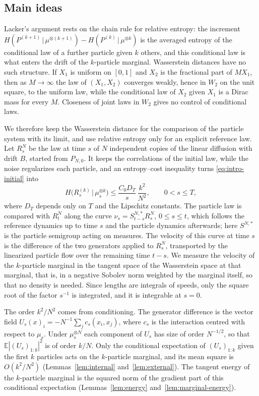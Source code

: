 \documentclass[11pt]{amsart}
\numberwithin{equation}{section}
\theoremstyle{plain}
\theoremstyle{remark}
\newcommand{\E}{\mathbb{E}}
\newcommand{\W}{W_2}
\begin{document}
\subsection{Main ideas}
Lacker's argument rests on the chain rule for relative entropy: the increment $H(P^{(k+1)}\,|\,\mu^{\otimes(k+1)})-H(P^{(k)}\,|\,\mu^{\otimes k})$ is the averaged entropy of the conditional law of a further particle given $k$ others, and this conditional law is what enters the drift of the $k$-particle marginal. Wasserstein distances have no such structure. If $X_1$ is uniform on $[0,1]$ and $X_2$ is the fractional part of $MX_1$, then as $M\to\infty$ the law of $(X_1,X_2)$ converges weakly, hence in $\W$ on the unit square, to the uniform law, while the conditional law of $X_2$ given $X_1$ is a Dirac mass for every $M$. Closeness of joint laws in $\W$ gives no control of conditional laws.

We therefore keep the Wasserstein distance for the comparison of the particle system with its limit, and use relative entropy only for an explicit reference law. Let $R^N_s$ be the law at time $s$ of $N$ independent copies of the linear diffusion with drift $B$, started from $P_{N,0}$. It keeps the correlations of the initial law, while the noise regularizes each particle, and an entropy--cost inequality turns \eqref{eq:intro-initial} into
\[
H\big(R^{(k)}_s\,\big|\,\mu_s^{\otimes k}\big)\le\frac{C_0D_T}{s}\,\frac{k^2}{N^2},\qquad 0<s\le T,
\]
where $D_T$ depends only on $T$ and the Lipschitz constants. The particle law is compared with $R^N_t$ along the curve $\nu_s=S^{N,*}_{t-s}R^N_s$, $0\le s\le t$, which follows the reference dynamics up to time $s$ and the particle dynamics afterwards; here $S^{N,*}$ is the particle semigroup acting on measures. The velocity of this curve at time $s$ is the difference of the two generators applied to $R^N_s$, transported by the linearized particle flow over the remaining time $t-s$. We measure the velocity of the $k$-particle marginal in the tangent space of the Wasserstein space at that marginal, that is, in a negative Sobolev norm weighted by the marginal itself, so that no density is needed. Since lengths are integrals of speeds, only the square root of the factor $s^{-1}$ is integrated, and it is integrable at $s=0$.

The order $k^2/N^2$ comes from conditioning. The generator difference is the vector field $U_s(x)_i=-N^{-1}\sum_jc_s(x_i,x_j)$, where $c_s$ is the interaction centred with respect to $\mu_s$. Under $\mu_s^{\otimes N}$ each component of $U_s$ has size of order $N^{-1/2}$, so that $\E|(U_s)_{1:k}|^2$ is of order $k/N$. Only the conditional expectation of $(U_s)_{1:k}$ given the first $k$ particles acts on the $k$-particle marginal, and its mean square is $O(k^2/N^2)$ (Lemmas~\ref{lem:internal} and~\ref{lem:external}). The tangent energy of the $k$-particle marginal is the squared norm of the gradient part of this conditional expectation (Lemmas~\ref{lem:energy} and~\ref{lem:marginal-energy}).
\end{document}
